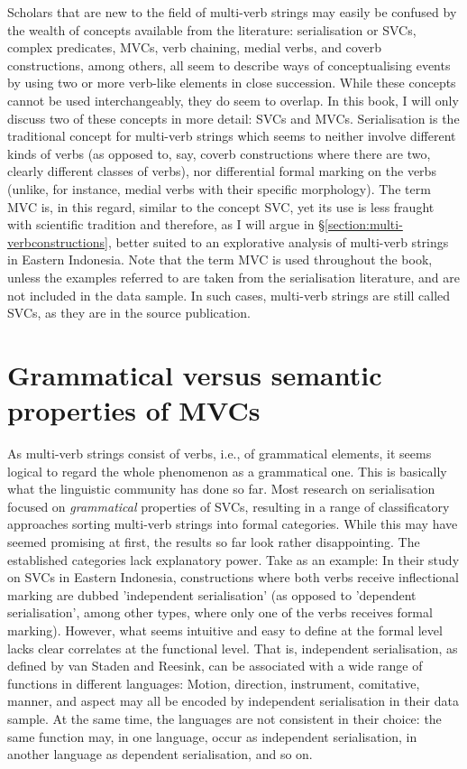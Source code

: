 Scholars that are new to the field of multi-verb strings may easily be confused by the wealth of concepts available from the literature: serialisation or SVCs, complex predicates, MVCs, verb chaining, medial verbs, and coverb constructions, among others, all seem to describe ways of conceptualising events by using two or more verb-like elements in close succession. While these concepts cannot be used interchangeably, they do seem to overlap. In this book, I will only discuss two of these concepts in more detail: SVCs and MVCs. Serialisation is the traditional concept for multi-verb strings which seems to neither involve different kinds of verbs (as opposed to, say, coverb constructions where there are two, clearly different classes of verbs), nor differential formal marking on the verbs (unlike, for instance, medial verbs with their specific morphology). The term MVC is, in this regard, similar to the concept SVC, yet its use is less fraught with scientific tradition and therefore, as I will argue in §\ref{section:multi-verbconstructions}, better suited to an explorative analysis of multi-verb strings in Eastern Indonesia. Note that the term MVC is used throughout the book, unless the examples referred to are taken from the serialisation literature, and are not included in the data sample. In such cases, multi-verb strings are still called SVCs, as they are in the source publication.

\section*{Grammatical versus semantic properties of MVCs}

As multi-verb strings consist of verbs, i.e., of grammatical elements, it seems logical to regard the whole phenomenon as a grammatical one. This is basically what the linguistic community has done so far. Most research on serialisation focused on \emph{grammatical} properties of SVCs, resulting in a range of classificatory approaches sorting multi-verb strings into formal categories. While this may have seemed promising at first, the results so far look rather disappointing. The established categories lack explanatory power. Take \citet{vanstaden2008serial} as an example: In their study on SVCs in Eastern Indonesia, constructions where both verbs receive inflectional marking are dubbed 'independent serialisation' (as opposed to 'dependent serialisation', among other types, where only one of the verbs receives formal marking). However, what seems intuitive and easy to define at the formal level lacks clear correlates at the functional level. That is, independent serialisation, as defined by van Staden and Reesink, can be associated with a wide range of functions in different languages: Motion, direction, instrument, comitative, manner, and aspect may all be encoded by independent serialisation in their data sample. At the same time, the languages are not consistent in their choice: the same function may, in one language, occur as independent serialisation, in another language as dependent serialisation, and so on. 

